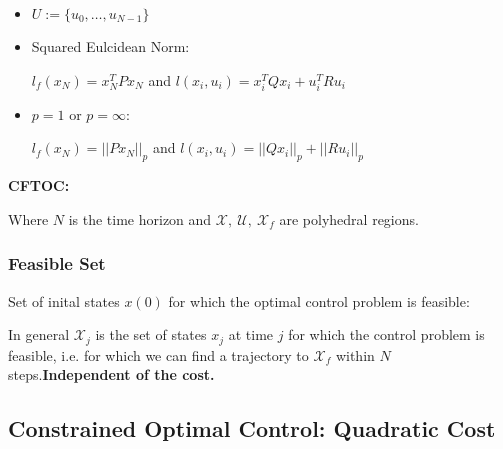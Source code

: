 \documentclass[8pt,a4paper]{scrartcl}
\begin{document}
\begin{multicols*}{3}

\begin{itemize}
\ncompaq
\item $U:=\{u_0,\ldots,u_{N-1}\}$
\item Squared Eulcidean Norm:

$l_f(x_N)=x_N^TPx_N$ and $l(x_i,u_i)=x_i^TQx_i+u_i^TRu_i$
\item $p=1$ or $p=\infty$: 

$l_f(x_N)=||Px_N||_p$ and $l(x_i,u_i)=||Qx_i||_p+||Ru_i||_p$
\end{itemize}

\textbf{CFTOC:}


Where $N$ is the time horizon and $\mathcal{X},\ \mathcal{U},\ \mathcal{X}_f$ are polyhedral regions.

\subsubsection{Feasible Set}

Set of inital states $x(0)$ for which the optimal control problem is feasible:


In general $\mathcal{X}_j$ is the set of states $x_j$ at time $j$ for which the control problem is feasible, i.e. for which we can find a trajectory to $\mathcal{X}_f$ within $N$ steps.\textbf{Independent of the cost.}

\subsection{Constrained Optimal Control: Quadratic Cost}




\end{multicols*}
\end{document}
